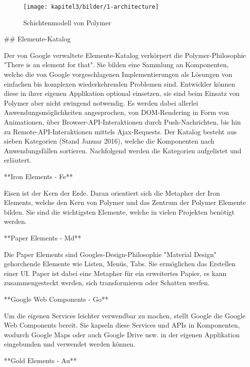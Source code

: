 \begin{figure}[htbp]
 \centering
 \texttt{[image: kapitel3/bilder/1-architecture]}
 \caption{Schichtenmodell von Polymer}
 \label{fig:schimopo}
\end{figure}









\iffalse

## Elemente-Katalog

Der von Google verwaltete Elemente-Katalog verkörpert die Polymer-Philosophie "There is an element for that". Sie bilden eine Sammlung an Komponenten, welche die von Google vorgeschlagenen Implementierungen als Lösungen von einfachen bis komplexen wiederkehrenden Problemen sind. Entwickler können diese in ihrer eigenen Applikation optional einsetzen, sie sind beim Einsatz von Polymer aber nicht zwingend notwendig. Es werden dabei allerlei Anwendungsmöglichkeiten angesprochen, von DOM-Rendering in Form von Animationen, über Browser-API-Interaktionen durch Push-Nachrichten, bis hin zu Remote-API-Interaktionen mittels Ajax-Requests. Der Katalog besteht aus sieben Kategorien (Stand Januar 2016), welche die Komponenten nach Anwendungsfällen sortieren. Nachfolgend werden die Kategorien aufgelistet und erläutert.


**Iron Elements - Fe**

Eisen ist der Kern der Erde. Daran orientiert sich die Metapher der Iron Elements, welche den Kern von Polymer und das Zentrum der Polymer Elemente bilden. Sie sind die wichtigsten Elemente, welche in vielen Projekten benötigt werden.


**Paper Elements - Md**

Die Paper Elements sind Googles-Design-Philosophie "Material Design" gehorchende Elemente wie Listen, Menüs, Tabs. Sie ermöglichen das Erstellen einer UI. Paper ist dabei eine Metapher für ein erweitertes Papier, es kann zusammengesteckt werden, sich transformieren oder Schatten werfen.


**Google Web Components - Go**

Um die eigenen Services leichter verwendbar zu machen, stellt Google die Google Web Components bereit. Sie kapseln diese Services und APIs in Komponenten, wodurch Google Maps oder auch Google Drive usw. in der eigenen Applikation eingebunden und verwendet werden können.


**Gold Elements - Au**

